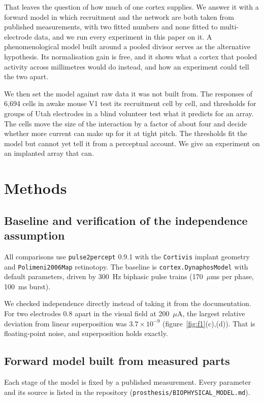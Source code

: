 \documentclass[10pt,twocolumn]{article}
\newcommand{\pptwo}{\texttt{pulse2percept}}
\newcommand{\um}{\ensuremath{\mu\text{m}}}
\newcommand{\uA}{\ensuremath{\mu\text{A}}}
\begin{document}
That leaves the question of how much of one cortex supplies. We answer it
with a forward model in which recruitment and the network are both taken
from published measurements, with two fitted numbers and none fitted to
multi-electrode data, and we run every experiment in this paper on it. A
phenomenological model built around a pooled divisor serves as the
alternative hypothesis. Its normalisation gain is free, and it shows what
a cortex that pooled activity across millimetres would do instead, and how
an experiment could tell the two apart.

We then set the model against raw data it was not built from. The
responses of 6,694 cells in awake mouse V1 test its recruitment cell by
cell, and thresholds for groups of Utah electrodes in a blind volunteer
test what it predicts for an array. The cells move the size of the
interaction by a factor of about four and decide whether more current can
make up for it at tight pitch. The thresholds fit the model but cannot yet
tell it from a perceptual account. We give an experiment
on an implanted array that can.

\section{Methods}

\subsection{Baseline and verification of the independence assumption}

All comparisons use \pptwo{} 0.9.1 with the \texttt{Cortivis} implant
geometry and \texttt{Polimeni2006Map} retinotopy. The baseline is
\texttt{cortex.DynaphosModel} with default parameters, driven by 300~Hz
biphasic pulse trains (170~\um{}s per phase, 100~ms burst).

We checked independence directly instead of taking it from the
documentation. For two electrodes 0.8\textdegree{} apart in the visual
field at 200~\uA, the largest relative deviation from linear superposition
was $3.7\times10^{-9}$ (figure~\ref{fig:f1}(c),(d)). That is
floating-point noise, and superposition holds exactly.

\subsection{Forward model built from measured parts}
\label{sec:biomethods}

Each stage of the model is fixed by a published measurement. Every
parameter and its source is listed in the repository
(\texttt{prosthesis/BIOPHYSICAL\_MODEL.md}).
\end{document}
